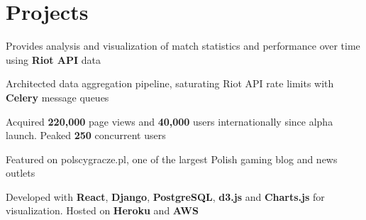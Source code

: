 \documentclass[]{peter_resume}
\begin{document}
\begin{minipage}{\textwidth}
\begin{comment}
\runsubsection{Imagine Communications}
\descript{\hfill Application Developer Intern}
\location{May 2014 – Aug 2014 | Waterloo, ON}
\begin{tightemize}
\item Developed an internal progress dashboard to record and monitor employee efficiency using \textbf{AngularJS} and \textbf{Bootstrap}
\item Worked on a \textbf{C\#} API for the progress dashboard
\item Maintained existing software systems by fixing bugs in the Silverlight frontend and \textbf{C\#} backend
\end{tightemize}
\sectionsep
\end{comment}


\section{Projects}
\begin{comment}
\runsubsection{RaiseMyElo}
\location{\hfill\urlstyle{same}\url{http://raisemyelo.gg}}
\descript{League of Legends improvement service platform}
\begin{tightemize}
\item A platform to connect gamers for coaching and elo improvement services
\item Developed with \textbf{LeGoLegends} library, \textbf{Go} backend, \textbf{PostgreSQL} databases, and \textbf{Charts.js} for visualization. Hosted on \textbf{Heroku}
\end{tightemize} 
\sectionsep
\end{comment}

 
\begin{tightemize}
\item Provides analysis and visualization of match statistics and performance over time using \textbf{Riot API} data
\item Architected data aggregation pipeline, saturating Riot API rate limits with \textbf{Celery} message queues
\item Acquired \textbf{220,000} page views and \textbf{40,000} users internationally since alpha launch. Peaked \textbf{250} concurrent users
\item Featured on polscygracze.pl, one of the largest Polish gaming blog and news outlets
\item Developed with \textbf{React}, \textbf{Django}, \textbf{PostgreSQL}, \textbf{d3.js} and \textbf{Charts.js} for visualization. Hosted on \textbf{Heroku} and \textbf{AWS}


\end{tightemize}
\end{minipage}
\end{document}
